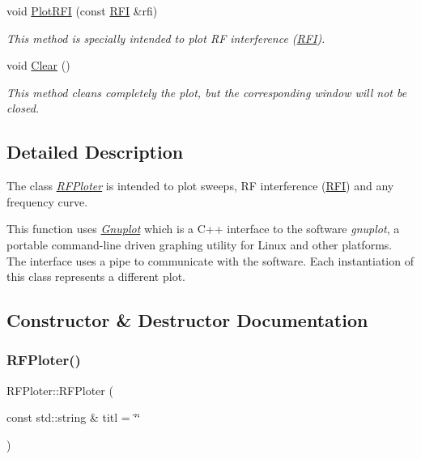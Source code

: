 \begin{DoxyCompactItemize}
void \hyperlink{classRFPloter_a18c4a6bfa7b41a799b9d808b8341b43c}{Plot\+R\+FI} (const \hyperlink{structRFI}{R\+FI} \&rfi)
\begin{DoxyCompactList}\small\item\em This method is specially intended to plot RF interference (\hyperlink{structRFI}{R\+FI}). \end{DoxyCompactList}\item 
\mbox{\label{classRFPloter_aff3f4c8c339120aa9394c5fea4f41edc}} 
void \hyperlink{classRFPloter_aff3f4c8c339120aa9394c5fea4f41edc}{Clear} ()
\begin{DoxyCompactList}\small\item\em This method cleans completely the plot, but the corresponding window will not be closed. \end{DoxyCompactList}\end{DoxyCompactItemize}


\subsection{Detailed Description}
The class {\itshape \hyperlink{classRFPloter}{R\+F\+Ploter}} is intended to plot sweeps, RF interference (\hyperlink{structRFI}{R\+FI}) and any frequency curve. 

This function uses {\itshape \hyperlink{classGnuplot}{Gnuplot}} which is a C++ interface to the software {\itshape gnuplot}, a portable command-\/line driven graphing utility for Linux and other platforms. The interface uses a pipe to communicate with the software. Each instantiation of this class represents a different plot. 

\subsection{Constructor \& Destructor Documentation}
\mbox{\label{classRFPloter_ab7b36c6de3e288b7ab88238b16a0816a}} 
\subsubsection{\texorpdfstring{R\+F\+Ploter()}{RFPloter()}}
{\footnotesize\ttfamily R\+F\+Ploter\+::\+R\+F\+Ploter (\begin{DoxyParamCaption}\item[{const std\+::string \&}]{titl = {\ttfamily \char`\"{}\char`\"{}} }\end{DoxyParamCaption})\hspace{0.3cm}{\ttfamily [inline]}}



